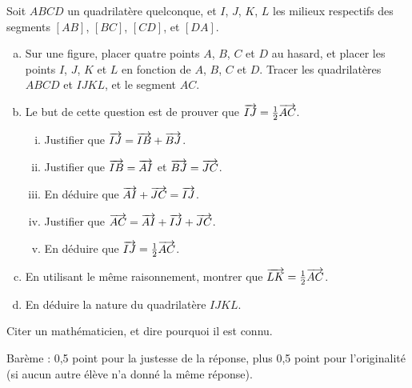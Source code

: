 \documentclass[11pt]{article}
\begin{document}
\begin{exercice}[5 points]
  Soit $ABCD$ un quadrilatère quelconque, et $I$, $J$, $K$, $L$ les milieux respectifs des segments $[AB]$, $[BC]$, $[CD]$, et $[DA]$.
  \begin{enumerate}[(a)]
    \item Sur une figure, placer quatre points $A$, $B$, $C$ et $D$ au
      hasard, et placer les points $I$, $J$, $K$ et $L$ en fonction de $A$,
      $B$, $C$ et $D$. Tracer les quadrilatères $ABCD$ et $IJKL$, et le
      segment $AC$.
    \item Le but de cette question est de prouver que $\overrightarrow{IJ}=\frac{1}{2}\overrightarrow{AC}$.
      \begin{enumerate}[(i)]
        \item Justifier que $\overrightarrow{IJ} = \overrightarrow{IB}+\overrightarrow{BJ}$.
        \item Justifier que $\overrightarrow{IB}=\overrightarrow{AI}$ et $\overrightarrow{BJ}=\overrightarrow{JC}$.
        \item En déduire que $\overrightarrow{AI}+\overrightarrow{JC}=\overrightarrow{IJ}$.
        \item Justifier que $\overrightarrow{AC}=\overrightarrow{AI}+\overrightarrow{IJ}+\overrightarrow{JC}$.
        \item En déduire que $\overrightarrow{IJ}=\frac{1}{2}\overrightarrow{AC}$.
      \end{enumerate}
    \item En utilisant le même raisonnement, montrer que $\overrightarrow{LK}=\frac{1}{2}\overrightarrow{AC}$.
    \item En déduire la nature du quadrilatère $IJKL$.
  \end{enumerate}
\end{exercice}

\begin{exercice}[Bonus]
  Citer un mathématicien, et dire pourquoi il est connu.

  \begin{em}
    \noindent
    Barème : 0,5 point pour la justesse de la réponse, plus 0,5 point pour
    l'originalité (si aucun autre élève n'a donné la même réponse).
  \end{em}
\end{exercice}
\end{document}
